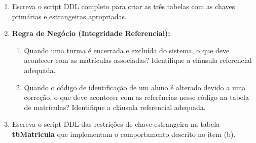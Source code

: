 \documentclass[12pt,a4paper]{article}
\newcommand{\resposta}[1]{}
\begin{document}
\begin{enumerate}[label=\textbf{\alph*)}]
    \item Escreva o script DDL completo para criar as três tabelas com as chaves primárias e estrangeiras apropriadas.
    \resposta{4cm}
    
    \item \textbf{Regra de Negócio (Integridade Referencial):} 
    \begin{enumerate}[label=\arabic*.]
        \item Quando uma turma é encerrada e excluída do sistema, o que deve acontecer com as matrículas associadas? Identifique a cláusula referencial adequada.
        \item Quando o código de identificação de um aluno é alterado devido a uma correção, o que deve acontecer com as referências nesse código na tabela de matrículas? Identifique a cláusula referencial adequada.
    \end{enumerate}
    \resposta{3cm}
    
    \item Escreva o script DDL das restrições de chave estrangeira na tabela \textbf{tbMatricula} que implementam o comportamento descrito no item (b).
    \resposta{3cm}
\end{enumerate}
\end{document}
